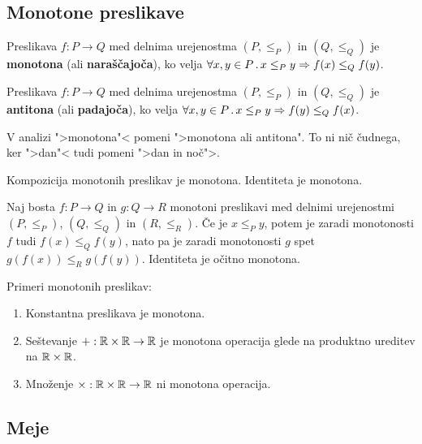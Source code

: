 \subsection{Monotone preslikave}

\begin{definicija}
  Preslikava $f : P \to Q$ med delnima urejenostma $(P, {\leq_P})$ in $(Q, {\leq_Q})$ je
  \textbf{monotona} (ali \textbf{naraščajoča}), ko velja $\forall x, y \in P \,.\, x \leq_P y \Rightarrow f(x) \leq_Q f(y)$.
\end{definicija}

\begin{definicija}
  Preslikava $f : P \to Q$ med delnima urejenostma $(P, \leq_P)$ in $(Q, \leq_Q)$ je
  \textbf{antitona} (ali \textbf{padajoča}), ko velja $\forall x, y \in P \,.\, x \leq_P y \Rightarrow f(y) \leq_Q f(x)$.
\end{definicija}

\begin{opomba}
  V analizi ">monotona"< pomeni ">monotona ali antitona". To ni nič
  čudnega, ker ">dan"< tudi pomeni ">dan in noč">.
\end{opomba}

\begin{izrek}
  Kompozicija monotonih preslikav je monotona. Identiteta je monotona.
\end{izrek}

\begin{dokaz}
  Naj bosta $f : P \to Q$ in $g : Q \to R$ monotoni preslikavi med delnimi
  urejenostmi $(P, {\leq_P})$, $(Q, {\leq_Q})$ in $(R, {\leq_R})$. Če je $x \leq_P y$, potem je zaradi monotonosti $f$ tudi $f(x) \leq_Q f(y)$, nato pa je zaradi monotonosti $g$ spet $g(f(x)) \leq_R g(f(y))$. Identiteta je očitno monotona.
\end{dokaz}

\begin{primer}
  Primeri monotonih preslikav:
  \begin{enumerate}
    \item Konstantna preslikava je monotona.
    \item Seštevanje ${+} : \mathbb{R} \times \mathbb{R} \to \mathbb{R}$ je monotona operacija glede na produktno ureditev na $\mathbb{R} \times \mathbb{R}$.
    \item Množenje ${\times} : \mathbb{R} \times \mathbb{R} \to \mathbb{R}$ ni monotona operacija.
  \end{enumerate}
\end{primer}


\subsection{Meje}


